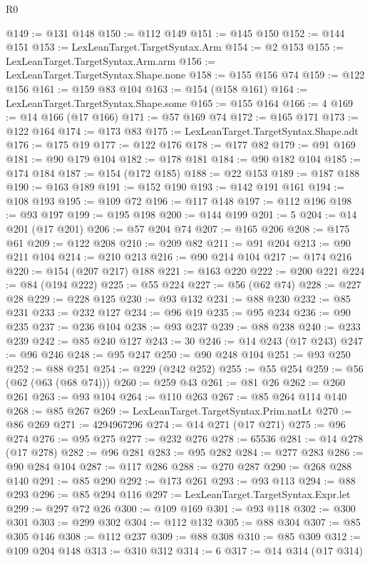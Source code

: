 \begin{lexlean}{R0}
\begin{coremodule}
@149 := @131 @148
@150 := @112 @149
@151 := @145 @150
@152 := @144 @151
@153 := LexLeanTarget.TargetSyntax.Arm
@154 := @2 @153
@155 := LexLeanTarget.TargetSyntax.Arm.arm
@156 := LexLeanTarget.TargetSyntax.Shape.none
@158 := @155 @156 @74
@159 := @122 @156
@161 := @159 @83 @104
@163 := @154 (@158 @161)
@164 := LexLeanTarget.TargetSyntax.Shape.some
@165 := @155 @164
@166 := 4
@169 := @14 @166 (@17 @166)
@171 := @57 @169 @74
@172 := @165 @171
@173 := @122 @164
@174 := @173 @83
@175 := LexLeanTarget.TargetSyntax.Shape.adt
@176 := @175 @19
@177 := @122 @176
@178 := @177 @82
@179 := @91 @169
@181 := @90 @179 @104
@182 := @178 @181
@184 := @90 @182 @104
@185 := @174 @184
@187 := @154 (@172 @185)
@188 := @22 @153
@189 := @187 @188
@190 := @163 @189
@191 := @152 @190
@193 := @142 @191 @161
@194 := @108 @193
@195 := @109 @72
@196 := @117 @148
@197 := @112 @196
@198 := @93 @197
@199 := @195 @198
@200 := @144 @199
@201 := 5
@204 := @14 @201 (@17 @201)
@206 := @57 @204 @74
@207 := @165 @206
@208 := @175 @61
@209 := @122 @208
@210 := @209 @82
@211 := @91 @204
@213 := @90 @211 @104
@214 := @210 @213
@216 := @90 @214 @104
@217 := @174 @216
@220 := @154 (@207 @217) @188
@221 := @163 @220
@222 := @200 @221
@224 := @84 (@194 @222)
@225 := @55 @224
@227 := @56 (@62 @74)
@228 := @227 @28
@229 := @228 @125
@230 := @93 @132
@231 := @88 @230
@232 := @85 @231
@233 := @232 @127
@234 := @96 @19
@235 := @95 @234
@236 := @90 @235
@237 := @236 @104
@238 := @93 @237
@239 := @88 @238
@240 := @233 @239
@242 := @85 @240 @127
@243 := 30
@246 := @14 @243 (@17 @243)
@247 := @96 @246
@248 := @95 @247
@250 := @90 @248 @104
@251 := @93 @250
@252 := @88 @251
@254 := @229 (@242 @252)
@255 := @55 @254
@259 := @56 (@62 (@63 (@68 @74)))
@260 := @259 @43
@261 := @81 @26
@262 := @260 @261
@263 := @93 @104
@264 := @110 @263
@267 := @85 @264 @114 @140
@268 := @85 @267
@269 := LexLeanTarget.TargetSyntax.Prim.natLt
@270 := @86 @269
@271 := 4294967296
@274 := @14 @271 (@17 @271)
@275 := @96 @274
@276 := @95 @275
@277 := @232 @276
@278 := 65536
@281 := @14 @278 (@17 @278)
@282 := @96 @281
@283 := @95 @282
@284 := @277 @283
@286 := @90 @284 @104
@287 := @117 @286
@288 := @270 @287
@290 := @268 @288 @140
@291 := @85 @290
@292 := @173 @261
@293 := @93 @113
@294 := @88 @293
@296 := @85 @294 @116
@297 := LexLeanTarget.TargetSyntax.Expr.let
@299 := @297 @72 @26
@300 := @109 @169
@301 := @93 @118
@302 := @300 @301
@303 := @299 @302
@304 := @112 @132
@305 := @88 @304
@307 := @85 @305 @146
@308 := @112 @237
@309 := @88 @308
@310 := @85 @309
@312 := @109 @204 @148
@313 := @310 @312
@314 := 6
@317 := @14 @314 (@17 @314)

\end{coremodule}
\end{lexlean}
